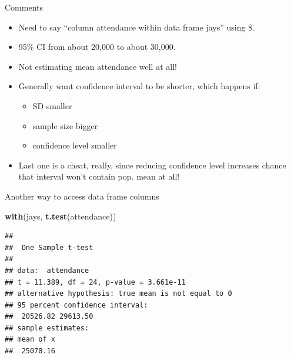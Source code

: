 \documentclass[ignorenonframetext,]{beamer}
\newenvironment{Shaded}{\begin{snugshade}}{\end{snugshade}}
\newcommand{\KeywordTok}[1]{\textcolor[rgb]{0.13,0.29,0.53}{\textbf{#1}}}
\newcommand{\NormalTok}[1]{#1}
\providecommand{\tightlist}{%
  \setlength{\itemsep}{0pt}\setlength{\parskip}{0pt}}
\begin{document}
\begin{frame}{Comments}
\protect\hypertarget{comments-1}{}

\begin{itemize}
\tightlist
\item
  Need to say ``column attendance within data frame jays'' using \$.
\item
  95\% CI from about 20,000 to about 30,000.
\item
  Not estimating mean attendance well at all!
\item
  Generally want confidence interval to be shorter, which happens if:

  \begin{itemize}
  \tightlist
  \item
    SD smaller
  \item
    sample size bigger
  \item
    confidence level smaller
  \end{itemize}
\item
  Last one is a cheat, really, since reducing confidence level increases
  chance that interval won't contain pop. mean at all!
\end{itemize}

\end{frame}

\begin{frame}[fragile]{Another way to access data frame columns}
\protect\hypertarget{another-way-to-access-data-frame-columns}{}

\begin{Shaded}
\begin{Highlighting}[]
\KeywordTok{with}\NormalTok{(jays, }\KeywordTok{t.test}\NormalTok{(attendance))}
\end{Highlighting}
\end{Shaded}

\begin{verbatim}
## 
##  One Sample t-test
## 
## data:  attendance
## t = 11.389, df = 24, p-value = 3.661e-11
## alternative hypothesis: true mean is not equal to 0
## 95 percent confidence interval:
##  20526.82 29613.50
## sample estimates:
## mean of x 
##  25070.16
\end{verbatim}

\end{frame}
\end{document}
